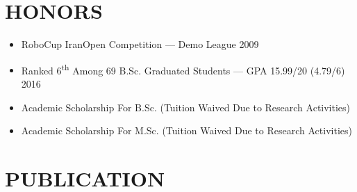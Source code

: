 \documentclass[10pt,a4paper,sans]{moderncv} %
\begin{document}
	\vspace{-1em}
	
	\section{HONORS}
	
	\begin{itemize}[nosep]
	    \item RoboCup IranOpen Competition --- Demo League \hfill 2009
		\item Ranked 6\textsuperscript{th} Among 69 B.Sc. Graduated Students --- GPA 15.99/20 (4.79/6) \hfill 2016
		\item Academic Scholarship For B.Sc. (Tuition Waived Due to Research Activities)
		\item Academic Scholarship For M.Sc. (Tuition Waived Due to Research Activities)
	\end{itemize}
    
	
	\vspace{-1em}
   
	\section{PUBLICATION}
	
\end{document}
